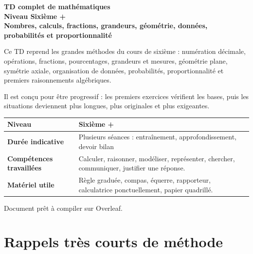 \documentclass[11pt,a4paper]{article}
\begin{document}
\begin{titlepage}
\centering
\vspace*{1cm}

{\Huge \textbf{TD complet de mathématiques}}\\[0.4cm]
{\Large \textbf{Niveau Sixième +}}\\[0.6cm]

{\LARGE \textbf{Nombres, calculs, fractions, grandeurs, géométrie, données, probabilités et proportionnalité}}\\[1cm]

\begin{tcolorbox}[colframe=bleuprepa,colback=blue!3!white,width=0.9\textwidth,title=Objectif général]
Ce TD reprend les grandes méthodes du cours de sixième : numération décimale, opérations, fractions, pourcentages, grandeurs et mesures, géométrie plane, symétrie axiale, organisation de données, probabilités, proportionnalité et premiers raisonnements algébriques.

Il est conçu pour être progressif : les premiers exercices vérifient les bases, puis les situations deviennent plus longues, plus originales et plus exigeantes.
\end{tcolorbox}

\vfill

\begin{tabularx}{0.9\textwidth}{|>{\bfseries}l|X|}
\hline
Niveau & Sixième + \\
\hline
Durée indicative & Plusieurs séances : entraînement, approfondissement, devoir bilan \\
\hline
Compétences travaillées &
Calculer, raisonner, modéliser, représenter, chercher, communiquer, justifier une réponse. \\
\hline
Matériel utile & Règle graduée, compas, équerre, rapporteur, calculatrice ponctuellement, papier quadrillé. \\
\hline
\end{tabularx}

\vfill

{\large Document prêt à compiler sur Overleaf.}

\end{titlepage}

\tableofcontents
\newpage

\section{Rappels très courts de méthode}
\end{document}
